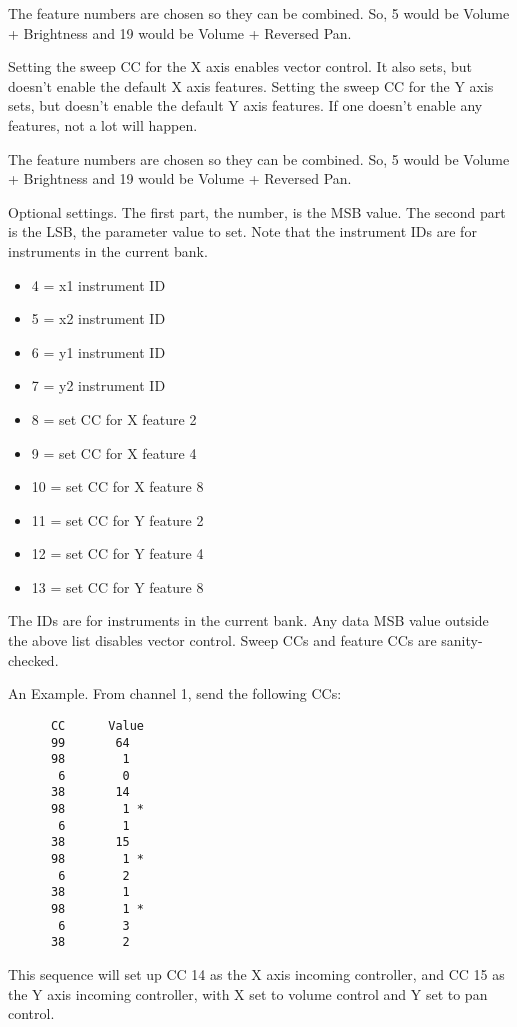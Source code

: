    The feature numbers are chosen so they can be combined. So, 5 would be
   Volume + Brightness and 19 would be Volume + Reversed Pan.

   Setting the sweep CC for the X axis enables vector control. It also sets,
   but doesn't enable the default X axis features.  Setting the sweep CC for
   the Y axis sets, but doesn't enable the default Y axis features.  If one
   doesn't enable any features, not a lot will happen.

   The feature numbers are chosen so they can be combined. So, 5 would be
   Volume + Brightness and 19 would be Volume + Reversed Pan.

   Optional settings.  The first part, the number, is the MSB value.
   The second part is the LSB, the parameter value to set.  Note that the
   instrument IDs are for instruments in the current bank.

   \begin{itemize}
      \item 4 = x1 instrument ID
      \item 5 = x2 instrument ID
      \item 6 = y1 instrument ID
      \item 7 = y2 instrument ID
      \item 8 = set CC for X feature 2
      \item 9 = set CC for X feature 4
      \item 10 = set CC for X feature 8
      \item 11 = set CC for Y feature 2
      \item 12 = set CC for Y feature 4
      \item 13 = set CC for Y feature 8
   \end{itemize}
              
   The IDs are for instruments in the current bank.
   Any data MSB value outside the above list disables vector control.
   Sweep CCs and feature CCs are sanity-checked.
    
   An Example. From channel 1, send the following CCs:

   \begin{verbatim}
      CC      Value
      99       64
      98        1
       6        0
      38       14
      98        1 *
       6        1
      38       15
      98        1 *
       6        2
      38        1
      98        1 *
       6        3
      38        2
   \end{verbatim}

   This sequence will set up CC 14 as the X axis incoming controller,
   and CC 15 as the Y axis incoming controller, with X set to volume control
   and Y set to pan control.

